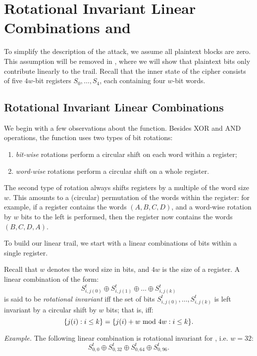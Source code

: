 
\section{Rotational Invariant Linear Combinations and \MiniMORUS}
\label{sec/introminimorus}

To simplify the description of the attack, we assume all plaintext blocks are zero. This assumption will be removed in , where we will show that plaintext bits only contribute linearly to the trail. Recall that the inner state of the cipher consists of five $4w$-bit registers $S_0,\dots,S_4$, each containing four $w$-bit words.

\subsection{Rotational Invariant Linear Combinations}

We begin with a few observations about the \StateUpdate{} function. Besides XOR and AND operations, the \StateUpdate{} function uses two types of bit rotations:
\begin{enumerate}
\item \emph{bit-wise} rotations perform a circular shift on each word within a register;
\item \emph{word-wise} rotations perform a circular shift on a whole register.
\end{enumerate}
The second type of rotation always shifts registers by a multiple of the word size $w$. This amounts to a (circular) permutation of the words within the register: for example, if a register contains the words $(A, B, C, D)$, and a word-wise rotation by $w$ bits to the left is performed, then the register now contains the words $(B, C, D, A)$.

To build our linear trail, we start with a linear combinations of bits within a single register.
\begin{definition}
Recall that $w$ denotes the word size in bits, and $4w$ is the size of a register. A linear combination of the form:
\[
S^t_{i,j(0)} \oplus S^t_{i,j(1)} \oplus \dots \oplus S^t_{i,j(k)}
\]
is said to be \emph{rotational invariant} iff the set of bits $S^t_{i,j(0)}, \dots, S^t_{i,j(k)}$ is left invariant by a circular shift by $w$ bits; that is, iff:
\[
\{j(i) : i\leq k\} = \{j(i) + w \text{\rm{} mod } 4w : i\leq k\}.
\]
\end{definition}
\emph{Example.} The following linear combination is rotational invariant for \MORUS[640], i.e. $w = 32$:
\begin{equation}
S^t_{0,0} \oplus S^t_{0,32} \oplus S^t_{0,64} \oplus S^t_{0,96}.
\label{eq:symmetric}
\end{equation}


